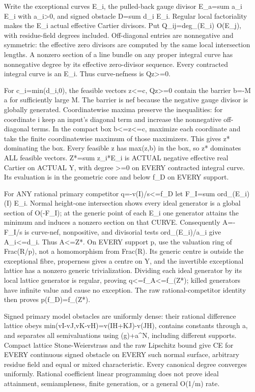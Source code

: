 \documentclass[11pt]{article}
\begin{document}
Write the exceptional curves E\_i, the pulled-back gauge divisor E\_a=sum a\_i E\_i with a\_i\textgreater{}0, and signed obstacle D=sum d\_i E\_i. Regular local factoriality makes the E\_i actual effective Cartier divisors. Put Q\_ij=deg\_(E\_i) O(E\_j), with residue-field degrees included. Off-diagonal entries are nonnegative and symmetric: the effective zero divisors are computed by the same local intersection lengths. A nonzero section of a line bundle on any proper integral curve has nonnegative degree by its effective zero-divisor sequence. Every contracted integral curve is an E\_i. Thus curve-nefness is Qz\textgreater{}=0.

For c\_i=min(d\_i,0), the feasible vectors z\textless{}=c, Qz\textgreater{}=0 contain the barrier b=-M a for sufficiently large M. The barrier is nef because the negative gauge divisor is globally generated. Coordinatewise maxima preserve the inequalities: for coordinate i keep an input's diagonal term and increase the nonnegative off-diagonal terms. In the compact box b\textless{}=z\textless{}=c, maximize each coordinate and take the finite coordinatewise maximum of those maximizers. This gives z* dominating the box. Every feasible z has max(z,b) in the box, so z* dominates ALL feasible vectors. Z*=sum z\_i*E\_i is ACTUAL negative effective real Cartier on ACTUAL Y, with degree \textgreater{}=0 on EVERY contracted integral curve. Its evaluation is in the geometric core and below f\_D on EVERY support.

For ANY rational primary competitor q=-v(I)/s\textless{}=f\_D let F\_I=sum ord\_(E\_i)(I) E\_i. Normal height-one intersection shows every ideal generator is a global section of O(-F\_I); at the generic point of each E\_i one generator attains the minimum and induces a nonzero section on that CURVE. Consequently A=-F\_I/s is curve-nef, nonpositive, and divisorial tests ord\_(E\_i)/a\_i give A\_i\textless{}=d\_i. Thus A\textless{}=Z*. On EVERY support p, use the valuation ring of Frac(R/p), not a homomorphism from Frac(R). Its generic centre is outside the exceptional fibre, properness gives a centre on Y, and the invertible exceptional lattice has a nonzero generic trivialization. Dividing each ideal generator by its local lattice generator is regular, proving q\textless{}=f\_A\textless{}=f\_(Z*); killed generators have infinite value and cause no exception. The raw rational-competitor identity then proves p(f\_D)=f\_(Z*).

Signed primary model obstacles are uniformly dense: their rational difference lattice obeys min(vI-vJ,vK-vH)=v(IH+KJ)-v(JH), contains constants through a, and separates all semivaluations using (g)+a\textasciicircum{}N, including different supports. Compact lattice Stone-Weierstrass and the raw Lipschitz bound give CE for EVERY continuous signed obstacle on EVERY such normal surface, arbitrary residue field and equal or mixed characteristic. Every canonical degree converges uniformly. Rational coefficient linear programming does not prove ideal attainment, semiampleness, finite generation, or a general O(1/m) rate.
\end{document}
